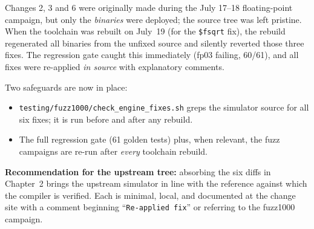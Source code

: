 \documentclass[11pt,a4paper]{report}
\begin{document}
Changes 2, 3 and 6 were originally made during the July 17--18
floating-point campaign, but only the \emph{binaries} were deployed; the
source tree was left pristine. When the toolchain was rebuilt on July~19
(for the \texttt{\$fsqrt} fix), the rebuild regenerated all binaries from the
unfixed source and silently reverted those three fixes. The regression gate
caught this immediately (fp03 failing, 60/61), and all fixes were re-applied
\emph{in source} with explanatory comments.

Two safeguards are now in place:

\begin{itemize}
  \item \texttt{testing/fuzz1000/check\_engine\_fixes.sh} greps the simulator
        source for all six fixes; it is run before and after any rebuild.
  \item The full regression gate (61 golden tests) plus, when relevant, the
        fuzz campaigns are re-run after \emph{every} toolchain rebuild.
\end{itemize}

\textbf{Recommendation for the upstream tree:} absorbing the six diffs in
Chapter~2 brings the upstream simulator in line with the reference against
which the compiler is verified. Each is minimal, local, and documented at the
change site with a comment beginning ``\texttt{Re-applied fix}'' or referring
to the fuzz1000 campaign.
\end{document}
